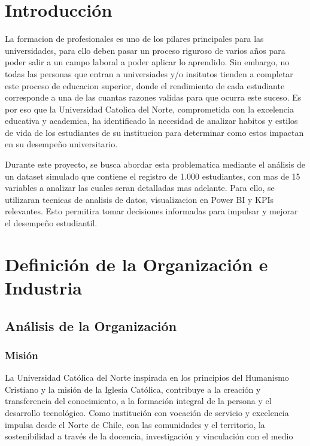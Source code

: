 \documentclass[12pt,letterpaper]{report}
\begin{document}
\chapter*{Introducción}

La formacion de profesionales es uno de los pilares principales para las universidades, para ello deben pasar un proceso riguroso de varios años para poder salir a un campo laboral a poder aplicar lo aprendido. Sin embargo, no todas las personas que entran a universiades y/o insitutos tienden a completar este proceso de educacion superior, donde el rendimiento de cada estudiante corresponde a una de las cuantas razones validas para que ocurra este suceso. Es por eso que la Universidad Catolica del Norte, comprometida con la excelencia educativa y academica, ha identificado la necesidad de analizar habitos y estilos de vida de los estudiantes de su institucion para determinar como estos impactan en su desempeño universitario.

Durante este proyecto, se busca abordar esta problematica mediante el análisis de un dataset simulado que contiene el registro de 1.000 estudiantes, con mas de 15 variables a analizar las cuales seran detalladas mas adelante. Para ello, se utilizaran tecnicas de analisis de datos, visualizacion en Power BI y KPIs relevantes. Esto permitira tomar decisiones informadas para impulsar y mejorar el desempeño estudiantil.



\newpage

\chapter{Definición de la Organización e Industria}

\section{Análisis de la Organización}

\subsection{Misión}
La Universidad Católica del Norte inspirada en los principios del Humanismo Cristiano y la misión de la Iglesia Católica, contribuye a la creación y transferencia del conocimiento, a la formación integral de la persona y el desarrollo tecnológico. Como institución con vocación de servicio y excelencia impulsa desde el Norte de Chile, con las comunidades y el territorio, la sostenibilidad a través de la docencia, investigación y vinculación con el medio
\end{document}

